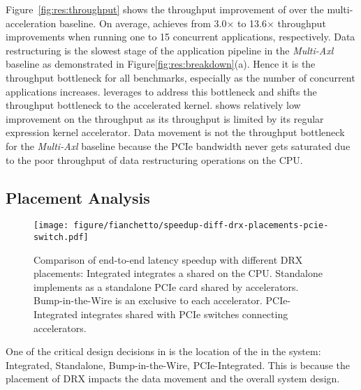 %
Figure~\ref{fig:res:throughput} shows the throughput improvement of \dmx over the multi-acceleration baseline.
%
On average, \dmx achieves from 3.0$\times$ to 13.6$\times$ throughput improvements when running one to 15 concurrent applications, respectively. 
%
Data restructuring is the slowest stage of the application pipeline in the \emph{Multi-Axl} baseline as demonstrated in Figure\ref{fig:res:breakdown}(a).
%
Hence it is the throughput bottleneck for all benchmarks, especially as the number of concurrent applications increases.
%
\dmx leverages \drx to address this bottleneck and shifts the throughput bottleneck to the accelerated kernel.
%
\pir shows relatively low improvement on the throughput as its throughput is limited by its regular expression kernel accelerator.
%
Data movement is not the throughput bottleneck for the \emph{Multi-Axl} baseline because the PCIe bandwidth never gets saturated due to the poor throughput of data restructuring operations on the CPU.

\subsection{\drx Placement Analysis}
\label{sec:results:placement}

\begin{figure}[t!]
    \centering
    \texttt{[image: figure/fianchetto/speedup-diff-drx-placements-pcie-switch.pdf]}
    \caption{Comparison of end-to-end latency speedup with different DRX placements: 
    Integrated \drx integrates a shared \drx on the CPU. 
    Standalone \drx implements \drx as a standalone PCIe card shared by accelerators. 
    Bump-in-the-Wire \drx is an exclusive \drx to each accelerator.
    PCIe-Integrated \drx integrates shared \drxs with PCIe switches connecting accelerators.
    }
    \label{fig:res:speedup-drx-placement}
\end{figure}


\noindent One of the critical design decisions in \dmx is the location of the \drx in the system: Integrated, Standalone, Bump-in-the-Wire, PCIe-Integrated. 
%
This is because the placement of DRX impacts the data movement and the overall system design.
%

